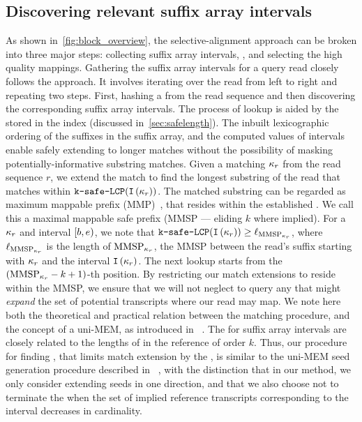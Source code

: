 \subsection{Discovering relevant suffix array intervals}
As shown in~\cref{fig:block_overview}, the selective-alignment approach can be 
broken into three major steps: collecting suffix array intervals, \cm, and selecting 
the high quality mappings. Gathering the suffix array intervals for a query read closely 
follows the \qm approach. It involves iterating over the read from left to right and 
repeating two steps. First, hashing a \kmer from the read sequence and then discovering the 
corresponding suffix array intervals. The process of \kmer lookup is aided by the \kslcp 
stored in the index (discussed in~\cref{sec:safelength}). The inbuilt lexicographic ordering 
of the suffixes in the suffix array, and the computed \kslcp values of intervals enable 
safely extending \kmers to longer matches without the possibility of masking 
potentially-informative substring matches. Given a matching \kmer ${\kappa}_r$ 
from the read sequence $r$, we extend the match to find the longest substring of the 
read that matches within $\mathrm{\texttt{k-safe-LCP}}(\texttt{I}\left({\kappa}_r\right))$. The matched 
substring can be regarded as maximum mappable prefix (MMP)~\citep{Dobin2013Star}, that 
resides within the established \kslcp. We call this a maximal mappable safe prefix 
(MMSP --- eliding $k$ where implied). For a \kmer ${\kappa}_r$ and interval 
$\left[b,e\right)$, we note that $\mathrm{\texttt{\kslcp}}(\ival{\samplekmer_r}) 
\geq \length{\MMSP_{\samplekmer_r}}$, where $\length{\MMSP_{\samplekmer_r}}$ is the 
length of $\MMSP_{\samplekmer_r}$, the MMSP between the read's suffix starting with 
${\kappa}_r$ and the interval $\texttt{I}\left({\kappa}_r\right)$. The next \kmer lookup starts 
from the $(\MMSP_{\samplekmer_r}-k+1)$-th position. By restricting our match extensions 
to reside within the MMSP, we ensure that we will not neglect to query any \kmer that 
might \emph{expand} the set of potential transcripts where our read may map. We note 
here both the theoretical and practical relation between the \MMSP matching procedure, 
and the concept of a uni-MEM, as introduced in \debga~\citep{debga}. The \kslcp for suffix array 
intervals are closely related to the lengths of \unitigs in the reference \ccdbg of order $k$. 
Thus, our procedure for finding , that limits match 
extension by the \kslcp, is similar to the uni-MEM seed generation procedure described 
in \debga~\citep{debga}, with the distinction that in our method, we only consider extending 
seeds in one direction, and that we also choose not to terminate the \kslcp when the set 
of implied reference transcripts corresponding to the interval decreases in cardinality.

